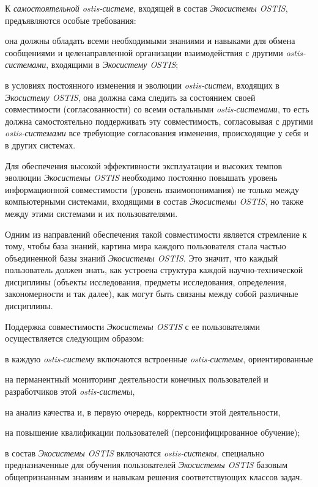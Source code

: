 К \textit{самостоятельной ostis-системе}, входящей в состав \textit{Экосистемы OSTIS}, предъявляются особые требования:
\begin{textitemize}
    \item она должны обладать всеми необходимыми знаниями и навыками для обмена сообщениями и целенаправленной организации взаимодействия с другими \textit{ostis-системами}, входящими в \textit{Экосистему OSTIS};
    \item в условиях постоянного изменения и эволюции \textit{ostis-систем}, входящих в \textit{Экосистему OSTIS}, она должна сама следить за состоянием своей совместимости (согласованности) со всеми остальными \textit{ostis-системами}, то есть должна самостоятельно поддерживать эту совместимость, согласовывая с другими \textit{ostis-системами} все требующие согласования изменения, происходящие у себя и в других системах.
\end{textitemize}

Для обеспечения высокой эффективности эксплуатации и высоких темпов эволюции \textit{Экосистемы OSTIS} необходимо постоянно повышать уровень информационной совместимости (уровень взаимопонимания) не только между компьютерными системами, входящими в состав \textit{Экосистемы OSTIS}, но также между этими системами и их пользователями. 

Одним из направлений обеспечения такой совместимости является стремление к тому, чтобы база знаний, картина мира каждого пользователя стала частью объединенной базы знаний \textit{Экосистемы OSTIS}. Это значит, что каждый пользователь должен знать, как устроена структура каждой научно-технической дисциплины (объекты исследования, предметы исследования, определения, закономерности и так далее), как могут быть связаны между собой различные дисциплины.

Поддержка совместимости \textit{Экосистемы OSTIS} с ее пользователями осуществляется следующим образом:
\begin{textitemize}
    \item в каждую \textit{ostis-систему} включаются встроенные \textit{ostis-системы}, ориентированные
    \begin{textitemize}
        \item на перманентный мониторинг деятельности конечных пользователей и разработчиков этой \textit{ostis-системы},
        \item на анализ качества и, в первую очередь, корректности этой деятельности,
        \item на повышение квалификации пользователей (персонифицированное обучение);
    \end{textitemize}
    \item в состав \textit{Экосистемы OSTIS} включаются \textit{ostis-системы}, специально предназначенные для обучения пользователей \textit{Экосистемы OSTIS} базовым общепризнанным знаниям и навыкам решения соответствующих классов задач.
\end{textitemize}

